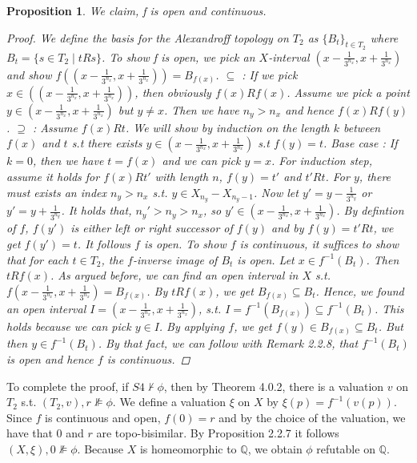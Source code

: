 \documentclass[12pt, a4paper]{scrartcl}
\newtheorem{proposition}[definition]{Proposition}
\begin{document}
\begin{proposition}
    We claim, f is open and continuous.

    \begin{proof}
        We define the basis for the Alexandroff topology on $T_2$ as $\{B_t\}_{t \in T_2}$ where $B_t = \{s \in T_2 \mid tRs\}$.
        To show f is open, we pick an $X$-interval $(x - \frac{1}{3^{n_x}}, x + \frac{1}{3^{n_x}})$ and show 
        $f((x - \frac{1}{3^{n_x}}, x + \frac{1}{3^{n_x}})) = B_{f(x)}$. \newline
        $\subseteq$ : If we pick $x \in ((x - \frac{1}{3^{n_x}}, x + \frac{1}{3^{n_x}}))$, then obviously $f(x)Rf(x)$. Assume we pick a point 
        $y \in (x - \frac{1}{3^{n_x}}, x + \frac{1}{3^{n_x}})$ but $y \neq x$. Then we have $n_y > n_x$ and hence $f(x) R f(y)$. \newline
        $\supseteq$ : Assume $f(x)Rt$. We will show by induction on the length $k$ between $f(x)$ and $t$ s.t there exists $y \in (x - \frac{1}{3^{n_x}}, x + \frac{1}{3^{n_x}})$ s.t $f(y) = t$.
        Base case : If $k = 0$, then we have $t = f(x)$ and we can pick $y = x$. For induction step, assume it holds for $f(x)Rt'$ with length $n$, $f(y) = t'$ and $t'Rt$.
        For $y$, there must exists an index $n_y > n_x$ s.t. $y \in X_{n_y} - X_{n_y -1}$. 
        Now let $y' = y - \frac{1}{3^{n_y}}$ or $y' = y + \frac{1}{3^{n_y}}$. It holds that, $n_y' > n_y > n_x$, so $y' \in (x - \frac{1}{3^{n_x}}, x + \frac{1}{3^{n_x}})$.
        By defintion of $f$, $f(y')$ is either left or right successor of $f(y)$ and by $f(y)= t' R t$, we get $f(y') = t$. It follows $f$ is open. \newline
        To show $f$ is continuous, it suffices to show that for each $t \in T_2$, the $f$-inverse image of $B_t$ is open. Let $x \in f^{-1}(B_t)$. Then $tRf(x)$. As argued before, we can find an open interval in $X$ s.t.
        $f (x - \frac{1}{3^{n_x}}, x + \frac{1}{3^{n_x}}) = B_{f(x)}$.  By $tRf(x)$, we get $B_{f(x)} \subseteq B_t$. Hence, we found an open interval
        $I = (x - \frac{1}{3^{n_x}}, x + \frac{1}{3^{n_x}})$, s.t. $I = f^{-1}(B_{f(x)}) \subseteq f^{-1}(B_t)$. This holds because we can pick $y \in I$. By applying $f$, we get $f(y) \in B_{f(x)} \subseteq B_t$. But then $y \in f^{-1}(B_t)$.
        By that fact, we can follow with Remark 2.2.8, that $f^{-1}(B_t)$ is open and hence $f$ is continuous.

    \end{proof}

\end{proposition}
\clearpage
To complete the proof, if $S4 \nvdash \phi$, then by Theorem 4.0.2, there is a valuation $v$ on $T_2$ s.t. $(T_2, v), r \nVDash \phi$. We define a valuation $\xi$ on $X$ by $\xi(p) = f^{-1}(v(p))$. Since $f$ is continuous and open, $f(0) = r$ and by the choice 
of the valuation, we have that $0$ and $r$ are topo-bisimilar. By Proposition 2.2.7 it follows $(X, \xi), 0 \nVDash \phi$. Because $X$ is homeomorphic to $\mathbb{Q}$, we obtain $\phi$ refutable on $\mathbb{Q}$.
\end{document}
